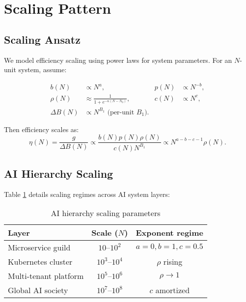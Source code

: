 \documentclass[10pt,conference]{IEEEtran}
\begin{document}
\section{Scaling Pattern}
\label{sec:scaling}

\subsection{Scaling Ansatz}
\label{sec:ansatz}

We model efficiency scaling using power laws for system parameters. For an $N$-unit system, assume:

\begin{align}
b(N) &\propto N^a, & p(N) &\propto N^{-b}, \nonumber\\
\rho(N) &\approx \frac{1}{1+e^{-\kappa(N-N_0)}}, & c(N) &\propto N^c, \nonumber\\
\Delta B(N) &\propto N^{B_1} \text{ (per-unit } B_1\text{).}
\end{align}

Then efficiency scales as:
\begin{equation}
\eta(N) = \frac{g}{\Delta B(N)} \propto \frac{b(N)p(N)\rho(N)}{c(N)N^{B_1}} \propto N^{a-b-c-1}\rho(N).
\label{eq:scaling}
\end{equation}

\subsection{AI Hierarchy Scaling}
\label{sec:ai_scaling}

Table \ref{tab:ai_scaling} details scaling regimes across AI system layers:

\begin{table}[!ht]
\centering\footnotesize
\caption{AI hierarchy scaling parameters}
\label{tab:ai_scaling}
\begin{tabular}{lcc}
\hline
Layer & Scale ($N$) & Exponent regime \\
\hline
Microservice guild & $10$--$10^2$ & $a=0, b=1, c=0.5$ \\
Kubernetes cluster & $10^3$--$10^4$ & $\rho$ rising \\
Multi-tenant platform & $10^5$--$10^6$ & $\rho \to 1$ \\
Global AI society & $10^7$--$10^8$ & $c$ amortized \\
\hline
\end{tabular}
\end{table}
\end{document}
